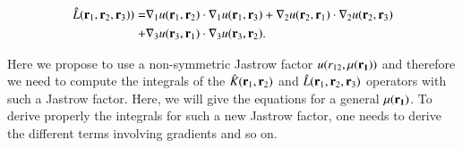\documentclass[aip,jcp,reprint,noshowkeys,superscriptaddress]{revtex4-1}
\newcommand{\bri}[1]{{\bf r}_{#1}}
\newcommand{\mur}[1]{\mu({\bf r_{#1}})}
\begin{document}
\begin{equation}
 \begin{aligned}
 \label{def_k}
  \hat{L}(\bri{1},\bri{2},\bri{3}) ) = & \nabla_1 u(\bri{1},\bri{2}) \cdot \nabla_1 u(\bri{1},\bri{3}) + \nabla_2 u(\bri{2},\bri{1}) \cdot \nabla_2 u(\bri{2},\bri{3})  \\
                                     + & \nabla_3 u(\bri{3},\bri{1}) \cdot \nabla_3 u(\bri{3},\bri{2}).
 \end{aligned}
\end{equation}

Here we propose to use a non-symmetric Jastrow factor $ u(r_{12},\mur{1})$ and therefore we need to compute the integrals of the $\hat{K}(\bri{1},\bri{2})$ and $\hat{L}(\bri{1},\bri{2},\bri{3})$ operators with such a Jastrow factor. 
Here, we will give the equations for a general $\mur{1}$. 
To derive properly the integrals for such a new Jastrow factor, one needs to derive the different terms involving gradients and so on. 
\end{document}
